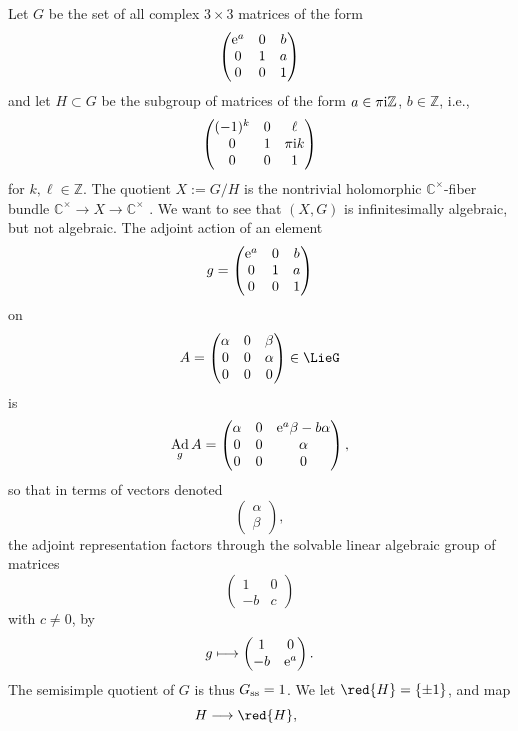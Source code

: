 \documentclass[pdftex]{sigma}
\numberwithin{equation}{section}
\renewcommand{\C}{\mathbb{C}}
\newcommand{\Z}{\mathbb{Z}}
\DeclareMathOperator{\Ad}{Ad}
\begin{document}
\begin{Example}
Let $G$ be the set of all complex $3 \times 3$ matrices of the form
\[
\begin{pmatrix}
{\rm e}^a & 0 & b \\
0 & 1 & a \\
0 & 0 & 1
\end{pmatrix}
\]
and let $H \subset G$ be the subgroup of matrices of the form $a \in \pi {\rm i} \Z$, $b \in \Z$, i.e.,
\[
\begin{pmatrix}
(-1)^k & 0 & \ell \\
0 & 1 & \pi {\rm i} k \\
0 & 0 & 1
\end{pmatrix}
\]
for $k,\ell \in \Z$.
The quotient $X := G/H$ is the nontrivial holomorphic $\C^{\times}$-fiber bundle $\C^{\times} \to X
 \to \C^{\times}$ \cite[Section~11]{McKay:2015}.
We want to see that $(X, G)$ is infinitesimally algebraic, but not algebraic.
The adjoint action of an element
\[
g =
\begin{pmatrix}
{\rm e}^a & 0 & b \\
0 & 1 & a \\
0 & 0 & 1
\end{pmatrix}
\]
on
\[
A=
\begin{pmatrix}
\alpha & 0 & \beta \\
0 & 0 & \alpha \\
0 & 0 & 0
\end{pmatrix}
\in \LieG
\]
is
\[
\Ad_g A =
\begin{pmatrix}
\alpha & 0 & {\rm e}^a\beta-b\alpha \\
0 & 0 & \alpha \\
0 & 0 & 0
\end{pmatrix},
\]
so that in terms of vectors denoted
\[
\begin{pmatrix}
\alpha \\
\beta
\end{pmatrix},
\]
the adjoint representation factors through the solvable linear algebraic group of matrices
\[
\begin{pmatrix}
1 & 0 \\
-b & c
\end{pmatrix}
\]
with $c\ne 0$, by
\[
g \longmapsto
\begin{pmatrix}
1 & 0 \\
-b & {\rm e}^a
\end{pmatrix}.
\]
The semisimple quotient of $G$ is thus $G_{\rm ss} = 1$.
We let $\red{H} = \{\pm 1\}$, and map
\[
H \longrightarrow \red{H}, \qquad
\]
\end{Example}
\end{document}
